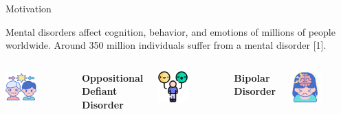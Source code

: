 \documentclass[spanish, aspectratio=169]{beamer}
\begin{document}
	
	
\frame{\titlepage}

\begin{frame}{Motivation}
	\begin{block}{}
		Mental disorders affect cognition, behavior, and emotions of millions of people worldwide. Around 350 million individuals suffer from a mental disorder [1].
	\end{block}
	
	\begin{columns}
		\centering
		\includegraphics[width=0.5\textwidth]{figures/OppositionalDefiantDisorder.png}
		
		\vspace{0.5em}
		\textbf{Oppositional Defiant Disorder}
		
		\centering
		\includegraphics[width=0.5\textwidth]{figures/BipolarDisorder.png}
		
		\vspace{0.5em}
		\textbf{Bipolar Disorder}
		
		\centering
		\includegraphics[width=0.5\textwidth]{figures/ADHD.png}
		

\end{columns}
\end{frame}
\end{document}
